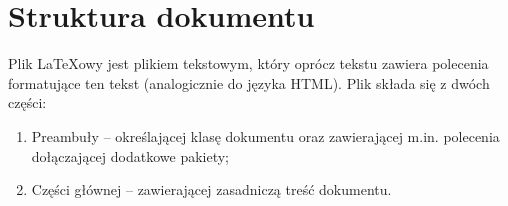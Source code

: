 
%









\section{Struktura dokumentu}
\label{sec:strukturaDokumentu}

Plik \LaTeX owy jest plikiem tekstowym, który oprócz tekstu zawiera polecenia formatujące ten tekst (analogicznie do języka HTML). Plik składa się z dwóch części:
\begin{enumerate}%
\item Preambuły -- określającej klasę dokumentu oraz zawierającej m.in. polecenia dołączającej dodatkowe pakiety;

\item Części głównej -- zawierającej zasadniczą treść dokumentu.
\end{enumerate}



